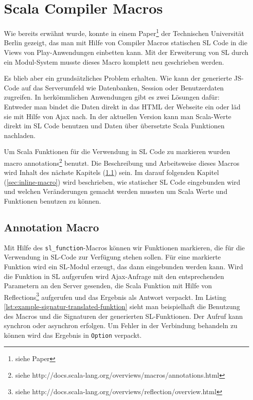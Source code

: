 \documentclass[12pt]{scrreprt}
\begin{document}
\chapter{Scala Compiler Macros}
\label{chap:scala-compiler-macros}

Wie bereits erwähnt wurde, konnte in einem Paper\footnote{siehe Paper} der Technischen Universität Berlin gezeigt, das man mit Hilfe von Compiler Macros statischen \ac{SL} Code in die Views von Play-Anwendungen einbetten kann. Mit der Erweiterung von \ac{SL} durch ein Modul-System musste dieses Macro komplett neu geschrieben werden.

Es blieb aber ein grundsätzliches Problem erhalten. Wie kann der generierte \ac{JS}-Code auf das Serverumfeld wie Datenbanken, Session oder Benutzerdaten zugreifen. In herkömmlichen Anwendungen gibt es zwei Lösungen dafür: Entweder man bindet die Daten direkt in das \ac{HTML} der Webseite ein oder läd sie mit Hilfe von Ajax nach. In der aktuellen Version kann man Scala-Werte direkt im \ac{SL} Code benutzen und Daten über übersetzte Scala Funktionen nachladen.

Um Scala Funktionen für die Verwendung in \ac{SL} Code zu markieren wurden macro annotations\footnote{siehe http://docs.scala-lang.org/overviews/macros/annotations.html} benutzt. Die Beschreibung und Arbeitsweise dieses Macros wird Inhalt des nächste Kapitels (\ref{sec:annotation-macro}) sein. Im darauf folgenden Kapitel (\ref{sec:inline-macro}) wird beschrieben, wie statischer \ac{SL} Code eingebunden wird und welchen Veränderungen gemacht werden mussten um Scala Werte und Funktionen benutzen zu können.

\section{Annotation Macro}
\label{sec:annotation-macro}

Mit Hilfe des \lstinline!sl_function!-Macros können wir Funktionen markieren, die für die Verwendung in \ac{SL}-Code zur Verfügung stehen sollen. Für eine markierte Funktion wird ein \ac{SL}-Modul erzeugt, das dann eingebunden werden kann. Wird die Funktion in SL aufgerufen wird Ajax-Anfrage mit den entsprechenden Parametern an den Server gesenden, die Scala Funktion mit Hilfe von Reflections\footnote{siehe http://docs.scala-lang.org/overviews/reflection/overview.html} aufgerufen und das Ergebnis als Antwort verpackt. Im Listing \ref{lst:example-signatur-translated-funktion} sieht man beispielhaft die Benutzung des Macros und die Signaturen der generierten SL-Funktionen. Der Aufruf kann synchron oder asynchron erfolgen. Um Fehler in der Verbindung behandeln zu können wird das Ergebnis in \lstinline!Option! verpackt.
\end{document}
